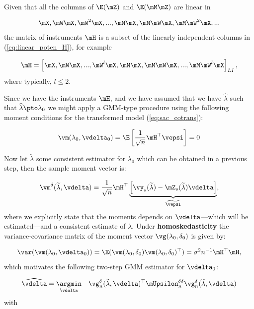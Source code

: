 \documentclass[english,12pt]{book}\usepackage[]{graphicx}\usepackage[]{xcolor}
\begin{document}
Given that all the columns of $\E(\mZ)$ and $\E(\mM\mZ)$ are linear in

\begin{equation}\label{eq:linear_poten_H}
  \mX, \mW\mX, \mW^2\mX, ..., \mM\mX, \mM\mW\mX, \mM\mW^2\mX,...
\end{equation}
%
the matrix of instruments $\mH$ is a subset of the linearly independent columns in (\ref{eq:linear_poten_H}), for example

\begin{equation*}
  \mH = \left[\mX, \mW\mX,..., \mW^l\mX, \mM\mX, \mM\mW\mX, ...,\mM\mW^l\mX\right]_{LI},
\end{equation*}
%
where typically, $l\leq 2$. 

Since we have the instruments $\mH$, and we have assumed that we have $\widehat{\lambda}$ such that $\widehat{\lambda}\pto \lambda_0$ we might apply a GMM-type procedure using the following moment conditions for the transformed model (\ref{eq:sac_cotrans}):

\begin{equation*}
  \vm(\lambda_0, \vdelta_0) = \E\left[\frac{1}{\sqrt{n}}\mH^\top\vepsi\right] = 0
\end{equation*}

Now let $\widetilde{\lambda}$ some consistent estimator for $\lambda_0$ which can be obtained in a previous step, then the sample moment vector is:

\begin{equation*}
  \vm^{\delta}(\widetilde{\lambda}, \vdelta) = \frac{1}{\sqrt{n}}\mH^\top\underbrace{\left[\vy_s(\widetilde{\lambda}) - \mZ_s(\widetilde{\lambda})\vdelta\right]}_{\widetilde{\vepsi}},
\end{equation*}
%
where we explicitly state that the moments depends on $\vdelta$---which will be estimated---and a consistent estimate of $\lambda$. Under \textbf{homoskedasticity} the variance-covariance matrix of the moment vector $\vg(\lambda_0, \delta_0)$ is given by:

\begin{equation*}
  \var(\vm(\lambda_0, \vdelta_0)) = \E(\vm(\lambda_0, \delta_0)\vm(\lambda_0, \delta_0)^\top) = \sigma^2n^{-1}\mH^\top\mH,
\end{equation*}
%
which motivates the following two-step GMM estimator for $\vdelta_0$:

\begin{equation*}
  \widehat{\vdelta} = \underset{\vdelta}{\argmin}\quad \vg^{\delta}_n(\widetilde{\lambda}, \vdelta)^\top \mUpsilon^{\delta\delta}_n\vg^{\delta}_n(\widetilde{\lambda}, \vdelta)
\end{equation*}
%
with
\end{document}
